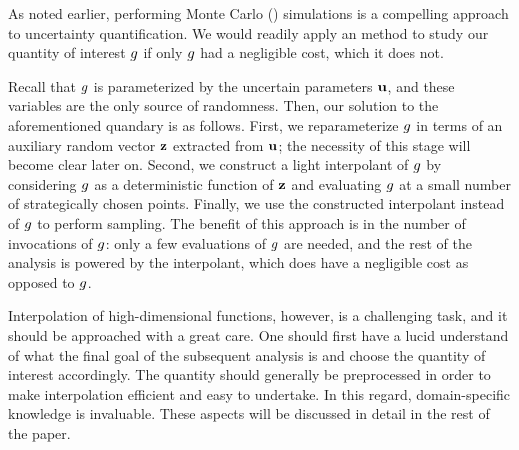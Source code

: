As noted earlier, performing Monte Carlo () simulations is a compelling
approach to uncertainty quantification. We would readily apply an 
method to study our quantity of interest $g$ if only $g$ had a negligible
cost, which it does not.

Recall that $g$ is parameterized by the uncertain parameters $\mathbf{u}$, and these
variables are the only source of randomness. Then, our solution to the
aforementioned quandary is as follows. First, we reparameterize $g$ in terms of
an auxiliary random vector $\mathbf{z}$ extracted from $\mathbf{u}$; the necessity of this
stage will become clear later on. Second, we construct a light interpolant of
$g$ by considering $g$ as a deterministic function of $\mathbf{z}$ and evaluating
$g$ at a small number of strategically chosen points. Finally, we use the
constructed interpolant instead of $g$ to perform sampling. The benefit of this
approach is in the number of invocations of $g$: only a few evaluations of $g$
are needed, and the rest of the analysis is powered by the interpolant, which
does have a negligible cost as opposed to $g$.

Interpolation of high-dimensional functions, however, is a challenging task, and
it should be approached with a great care. One should first have a lucid
understand of what the final goal of the subsequent analysis is and choose the
quantity of interest accordingly. The quantity should generally be preprocessed
in order to make interpolation efficient and easy to undertake. In this regard,
domain-specific knowledge is invaluable. These aspects will be discussed in
detail in the rest of the paper.
